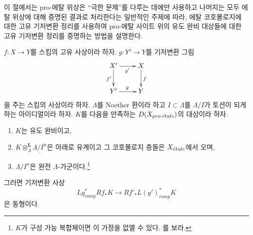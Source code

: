 \noindent
이 절에서는 pro-에탈 위상은 ``극한 문제''를 다루는 데에만 사용하고
나머지는 모두 에탈 위상에 대해 증명된 결과로 처리한다는 일반적인
주제에 따라, 에탈 코호몰로지에 대한 고유 기저변환 정리를 사용하여
pro-에탈 사이트 위의 유도 완비 대상들에 대한 고유 기저변환 정리를
증명하는 방법을 설명한다.

\begin{theorem}
\label{theorem-proper-base-change}
$f : X \to Y$를 스킴의 고유 사상이라 하자. $g : Y' \to Y$를 기저변환
그림
$$
\xymatrix{
X' \ar[r]_{g'} \ar[d]_{f'} & X \ar[d]^f \\
Y' \ar[r]^g & Y
}
$$
을 주는 스킴의 사상이라 하자. $\Lambda$를 Noether 환이라 하고
$I \subset \Lambda$를 $\Lambda/I$가 토션이 되게 하는 아이디얼이라
하자. $K$를 다음을 만족하는
$D(X_{pro\text{-}\acute{e}tale})$의 대상이라 하자.
\begin{enumerate}
\item $K$는 유도 완비이고,
\item $K \otimes_\Lambda^\mathbf{L} \underline{\Lambda/I^n}$은 아래로
유계이고 그 코호몰로지 층들은 $X_{\acute{e}tale}$에서 오며,
\item $\Lambda/I^n$은 완전 $\Lambda$-가군이다.\footnote{$K$가 구성
가능 복합체이면 이 가정을 없앨 수 있다. \cite{BS}를 보라.}
\end{enumerate}
그러면 기저변환 사상
$$
Lg_{comp}^*Rf_*K \longrightarrow Rf'_*L(g')^*_{comp}K
$$
은 동형이다.
\end{theorem}

